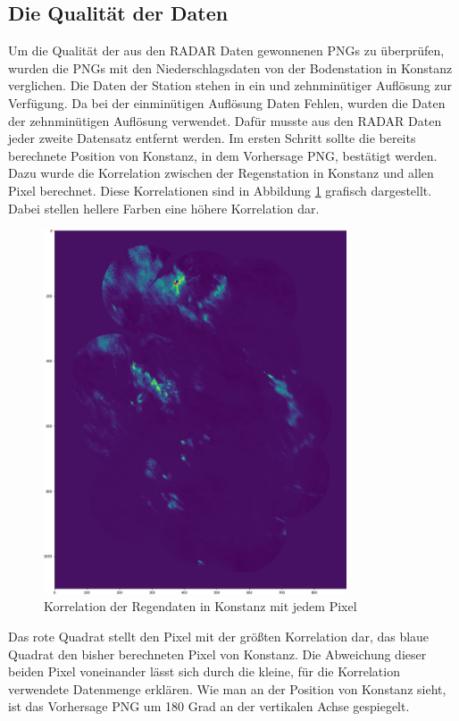 \subsection{Die Qualität der Daten}
Um die Qualität der aus den RADAR Daten gewonnenen PNGs zu überprüfen, wurden die PNGs mit den Niederschlagsdaten von der 
Bodenstation in Konstanz verglichen. 
Die Daten der Station stehen in ein und zehnminütiger Auflösung zur Verfügung. 
Da bei der einminütigen Auflösung Daten Fehlen, wurden die Daten der zehnminütigen Auflösung verwendet.
Dafür musste aus den RADAR Daten jeder zweite Datensatz entfernt werden. 
Im ersten Schritt sollte die bereits berechnete Position von Konstanz, in dem Vorhersage PNG, bestätigt werden.
Dazu wurde die Korrelation zwischen der Regenstation in Konstanz und allen Pixel berechnet. 
Diese Korrelationen sind in Abbildung \ref{fig:karte_korrelation} grafisch dargestellt.
Dabei stellen hellere Farben eine höhere Korrelation dar. 
\begin{figure}[H]
    \centering
    \includegraphics[width=0.8\textwidth,angle=0]{abb/Korrelation_Karte}
    \caption[Korrelationen der Regendaten in Kartenform]{Korrelation der Regendaten in Konstanz mit jedem Pixel}
   \label{fig:karte_korrelation}
\end{figure}

\noindent 
Das rote Quadrat stellt den Pixel mit der größten Korrelation dar, das blaue Quadrat den bisher berechneten Pixel von Konstanz. 
Die Abweichung dieser beiden Pixel voneinander lässt sich durch die kleine, für die Korrelation verwendete Datenmenge erklären. 
Wie man an der Position von Konstanz sieht, ist das Vorhersage PNG um 180 Grad an der vertikalen Achse gespiegelt.


